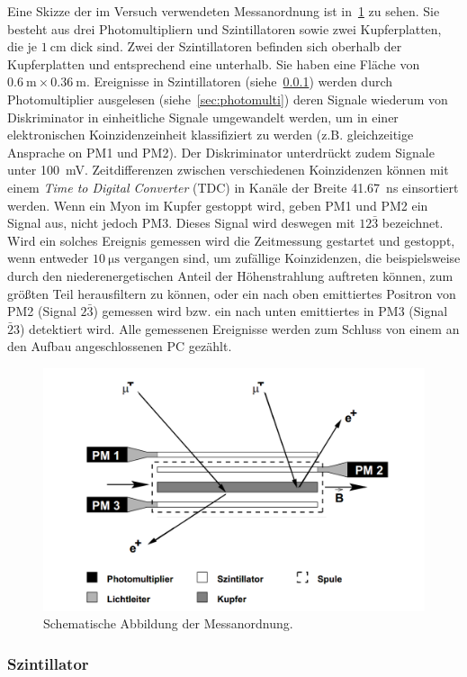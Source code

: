 \documentclass[slug=LM, room=Andreas-Schubert-Bau\,\ K\ 1A, supervisor=Anne-Sophie\ Berthold, coursedate=13.\ 12.\ 2019]{../../Lab_Report_LaTeX/lab_report}
\begin{document}
Eine Skizze der im Versuch verwendeten Messanordnung ist in~\ref{fig:aufbau} zu sehen.
Sie besteht aus drei Photomultipliern und Szintillatoren sowie zwei Kupferplatten, die je
\(\SI{1}{\centi\metre}\) dick sind. Zwei der Szintillatoren befinden sich oberhalb der Kupferplatten
und entsprechend eine unterhalb. Sie haben eine Fläche von \(\SI{0,6}{\metre} \times \SI{0,36}{\metre}\).
Ereignisse in Szintillatoren (siehe~\ref{sec:szinti}) werden durch
Photomultiplier ausgelesen (siehe~\ref{sec:photomulti}) deren Signale
wiederum von Diskriminator in einheitliche Signale umgewandelt werden,
um in einer elektronischen Koinzidenzeinheit klassifiziert zu werden
(z.B. gleichzeitige Ansprache on PM1 und PM2). Der Diskriminator
unterdr\"uckt zudem Signale unter \SI{100}{\milli\volt}. Zeitdifferenzen
zwischen verschiedenen Koinzidenzen k\"onnen mit einem \emph{Time to
  Digital Converter} (TDC) in Kan\"ale der Breite
\SI{41.67}{\nano\second} einsortiert werden.
Wenn ein Myon im Kupfer gestoppt wird, geben PM1 und PM2 ein Signal aus, nicht jedoch PM3.
Dieses Signal wird deswegen mit \(\textit{12}\bar{\textit{3}}\) bezeichnet. Wird ein
solches Ereignis gemessen wird die Zeitmessung gestartet und gestoppt, wenn entweder
\(\SI{10}{\micro\second}\) vergangen sind, um zufällige Koinzidenzen, die beispielsweise durch
den niederenergetischen Anteil der Höhenstrahlung auftreten können, zum größten Teil
herausfiltern zu können, oder
ein nach oben emittiertes Positron von PM2 (Signal \(\textit{2}\bar{\textit{3}}\)) gemessen wird 
bzw. ein nach unten emittiertes in
PM3 (Signal \(\bar{\textit{2}}\textit{3}\)) detektiert wird. Alle gemessenen Ereignisse werden
zum Schluss von einem an den Aufbau angeschlossenen PC gez\"ahlt.

\begin{figure}[H]\centering
        \includegraphics[width=.5\columnwidth]{./Versuchsaufbau.png}
        \caption{Schematische Abbildung der Messanordnung.}
        \label{fig:aufbau}
\end{figure}

\subsubsection{Szintillator}
\label{sec:szinti}
\end{document}
